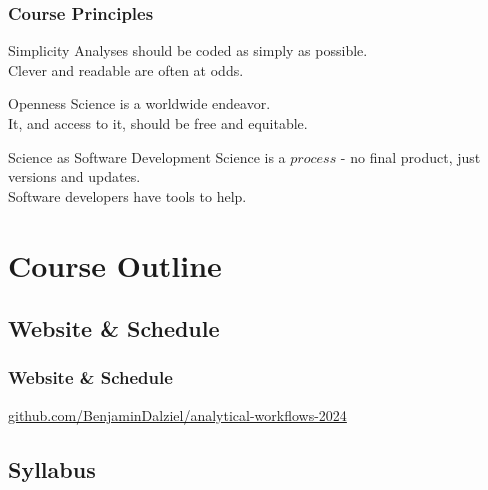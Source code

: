 \documentclass{beamer}
\begin{document}
\begin{frame}

    \frametitle{Course Principles}

        \begin{block}{Simplicity}
            Analyses should be coded as simply as possible.\\Clever and readable are often at odds.
        \end{block}

        \begin{block}{Openness}
            Science is a worldwide endeavor.\\It, and access to it, should be free and equitable.
        \end{block}

        \begin{block}{Science as Software Development}
            Science is a $process$ - no final product, just versions and updates.\\Software developers have tools to help.
        \end{block}


\end{frame}

\section{Course Outline}


\subsection{Website \& Schedule}

\begin{frame}
    \frametitle{Website \& Schedule}
    \url{github.com/BenjaminDalziel/analytical-workflows-2024}

\end{frame}


\subsection{Syllabus}

\end{document}

